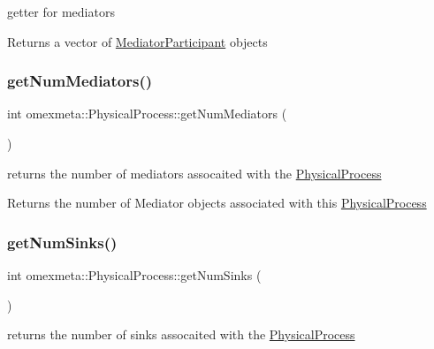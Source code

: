 getter for mediators 

\begin{DoxyReturn}{Returns}
a vector of \hyperlink{classomexmeta_1_1MediatorParticipant}{Mediator\+Participant} objects 
\end{DoxyReturn}
\mbox{\label{classomexmeta_1_1PhysicalProcess_a717a352ce3bb956201174002f904cd26}} 
\subsubsection{\texorpdfstring{get\+Num\+Mediators()}{getNumMediators()}}
{\footnotesize\ttfamily int omexmeta\+::\+Physical\+Process\+::get\+Num\+Mediators (\begin{DoxyParamCaption}{ }\end{DoxyParamCaption})}



returns the number of mediators assocaited with the \hyperlink{classomexmeta_1_1PhysicalProcess}{Physical\+Process} 

\begin{DoxyReturn}{Returns}
the number of Mediator objects associated with this \hyperlink{classomexmeta_1_1PhysicalProcess}{Physical\+Process} 
\end{DoxyReturn}
\mbox{\label{classomexmeta_1_1PhysicalProcess_ac8b79af15d4d19042ee34abca25f679f}} 
\subsubsection{\texorpdfstring{get\+Num\+Sinks()}{getNumSinks()}}
{\footnotesize\ttfamily int omexmeta\+::\+Physical\+Process\+::get\+Num\+Sinks (\begin{DoxyParamCaption}{ }\end{DoxyParamCaption})}



returns the number of sinks assocaited with the \hyperlink{classomexmeta_1_1PhysicalProcess}{Physical\+Process} 

